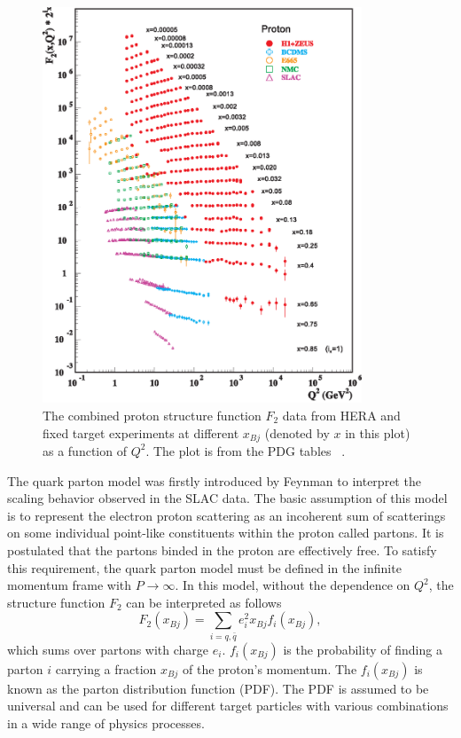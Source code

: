 \begin{figure}
\centering
\includegraphics[width=0.85\textwidth]{plots/chpt2/f2collider_logf2.eps}
\caption[Combined proton structure function $F_{2}$ distribution from different experiments] {
The combined proton structure function $F_{2}$ data from HERA and fixed target experiments at different $x_{Bj}$ (denoted by $x$ in this plot) as a function of $Q^{2}$. The plot is from the PDG tables ~\cite{Beringer:1900zz}.}
\label{fig:F2_pdg}
\end{figure}

The quark parton model was firstly introduced by Feynman to interpret the
scaling behavior observed in the SLAC data. The basic assumption of this model
is to represent the electron proton scattering as an incoherent sum of
scatterings on some individual point-like constituents within the proton called
partons. It is postulated that the partons binded in the proton are effectively
free. To satisfy this requirement, the quark parton model must be defined in the
infinite momentum frame with $P\rightarrow\infty$. In this model, without the
dependence on $Q^{2}$, the structure function $F_{2}$ can be interpreted as
follows
\begin{equation}
F_{2}(x_{Bj})=\sum_{i=q,\bar{q}}e^{2}_{i}x_{Bj}f_{i}(x_{Bj}),
\label{eqn:F2_QPM}
\end{equation}
which sums over partons with charge $e_{i}$. $f_{i}(x_{Bj})$ is the probability
of finding a parton $i$ carrying a fraction $x_{Bj}$ of the proton's momentum.
The $f_{i}(x_{Bj})$ is known as the parton distribution function (PDF). The PDF
is assumed to be universal and can be used for different target particles with
various combinations in a wide range of physics processes. 

